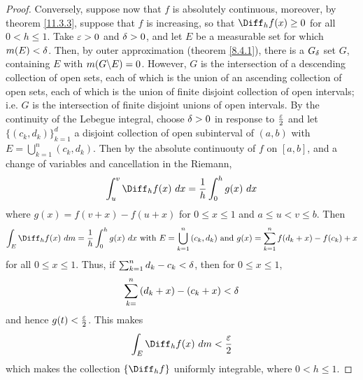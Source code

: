 \begin{proof}
    Conversely, suppose now that $f$ is absolutely continuous, moreover, by
    theorem \ref{11.3.3}, suppose that $f$ is increasing, so that
    $\Diff_h{f(x)} \geq 0$ for all $0<h \leq 1$. Take  $\varepsilon>0$ and $\delta>0$, and
    let $E$ be a measurable set for which  $m(E)<\delta$. Then, by outer
    approximation (theorem \ref{8.4.1}), there is a $G_\delta$ set  $G$, containing
     $E$ with  $m(G \backslash E)=0$. However, $G$ is the intersection of a
     descending collection of open sets, each of which is the union of an
     ascending collection of open sets, each of which is the union of finite
     disjoint collection of open intervals; i.e. $G$ is the intersection of
     finite disjoint unions of open intervals. By the continuity of the Lebegue
     integral, choose $\delta>0$ in response to  $\frac{\varepsilon}{2}$ and let
     $\{(c_k,d_k)\}_{k=1}^d$ a disjoint collection of open subinterval of
     $(a,b)$ with $E=\bigcup_{k=1}^n{(c_k,d_k)}$. Then by the absolute
     continuouty of $f$ on  $[a,b]$, and a change of variables and cancellation
     in the Riemann,
     \begin{equation*}
         \int_u^v{\Diff_h{f(x)} \ dx}=\frac{1}{h}\int_0^h{g(x) \ dx}
     \end{equation*}
     where $g(x)=f(v+x)-f(u+x)$ for $0 \leq x \leq 1$ and $a \leq u<v \leq b$.
     Then
     \begin{equation*}
         \int_E{\Diff_h{f(x)} \ dm}=\frac{1}{h}\int_0^h{g(x) \ dx} \text{ with }
         E=\bigcup_{k=1}^n{(c_k,d_k)} \text{ and }
         g(x)=\sum_{k=1}^n{f(d_k+x)-f(c_k)+x}
     \end{equation*}
     for all $0 \leq x \leq 1$. Thus, if $\sum_{k=1}^n{d_k-c_k}<\delta$, then for $0
     \leq x \leq 1$,
     \begin{equation*}
        \sum_{k=}^n{(d_k+x)-(c_k+x)}<\delta
     \end{equation*}
     and hence $g(t)<\frac{\varepsilon}{2}$. This makes
     \begin{equation*}
         \int_E{\Diff_h{f(x)} \ dm}<\frac{\e}{2}
     \end{equation*}
     which makes the collection $\{\Diff_h{f}\}$ uniformly integrable, where
     $0<h \leq 1$.
\end{proof}
